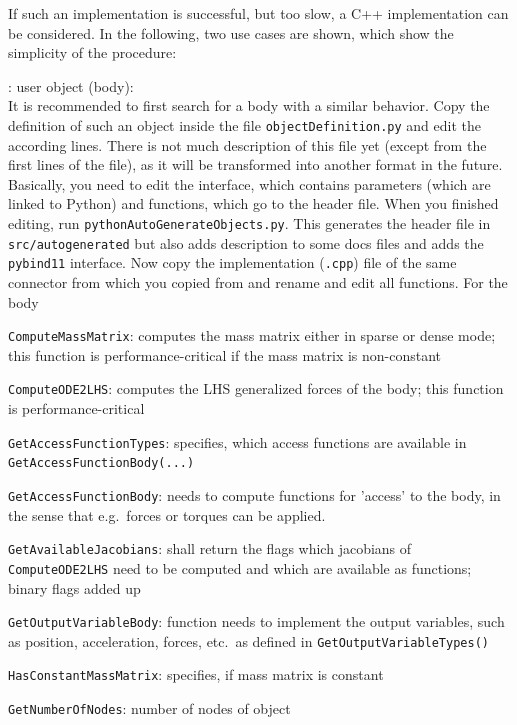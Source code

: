 If such an implementation is successful, but too slow, a C++ implementation can be considered.
In the following, two use cases are shown, which show the simplicity of the procedure:
\bi
  \item {}: user object (body):\\
  It is recommended to first search for a body with a similar behavior.
  Copy the definition of such an object inside the file \texttt{objectDefinition.py} and edit the according lines. 
  There is not much description of 
  this file yet (except from the first lines of the file), as it will be transformed into another format in the future.
  Basically, you need to edit the interface, which contains parameters (which are linked to Python) and functions, 
  which go to the header file.
  When you finished editing, run \texttt{pythonAutoGenerateObjects.py}. This generates the header file in \texttt{src/autogenerated}
  but also adds description to some docs files and adds the \texttt{pybind11} interface. 
  Now copy the implementation (\texttt{.cpp}) file of the same connector from which you copied from and rename and edit all functions.
  For the body
  \bi
    \item \texttt{ComputeMassMatrix}: computes the mass matrix either in sparse or dense mode; this function is performance-critical if the mass matrix is non-constant
    \item \texttt{ComputeODE2LHS}: computes the \ac{LHS} generalized forces of the body; this function is performance-critical
    \item \texttt{GetAccessFunctionTypes}: specifies, which access functions are available in \texttt{GetAccessFunctionBody(...)}
    \item \texttt{GetAccessFunctionBody}: needs to compute functions for 'access' to the body, in the sense that e.g.\ forces or torques can be applied. 
    \item \texttt{GetAvailableJacobians}: shall return the flags which jacobians of \texttt{ComputeODE2LHS} need to be computed and which are available as functions; binary flags added up
    \item \texttt{GetOutputVariableBody}: function needs to implement the output variables, such as position, acceleration, forces, etc.\ as defined in \texttt{GetOutputVariableTypes()}
    \item \texttt{HasConstantMassMatrix}: specifies, if mass matrix is constant
    \item \texttt{GetNumberOfNodes}: number of nodes of object
